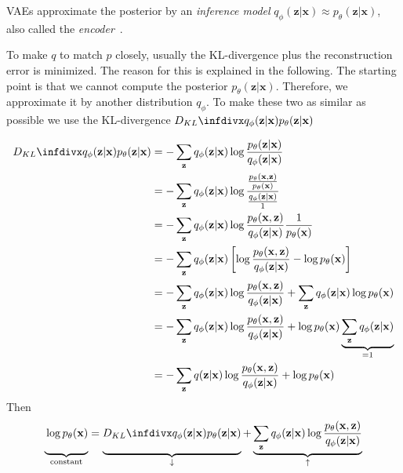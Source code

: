 \acp{VAE} approximate the posterior by an \textit{inference model} $q_\phi(\mathbf{z}|\mathbf{x}) \approx p_\theta(\mathbf{z}|\mathbf{x})$, also called the \textit{encoder}~\citep[p. 15]{kingma2019introduction}.

To make $q$ to match $p$ closely, usually the \ac{KL-divergence} plus the reconstruction error is minimized.
The reason for this is explained in the following.
The starting point is that we cannot compute the posterior $p_\theta(\mathbf{z}|\mathbf{x})$.
Therefore, we approximate it by another distribution $q_\phi$.
To make these two as similar as possible we use the \ac{KL-divergence} $\kldiv{q_\phi(\mathbf{z}|\mathbf{x})}{p_\theta(\mathbf{z}|\mathbf{x})}$

\begin{align}
    \kldiv{q_\phi(\mathbf{z}|\mathbf{x})}{p_\theta(\mathbf{z}|\mathbf{x})} &= -\sum_\mathbf{z} q_\phi(\mathbf{z}|\mathbf{x}) \log \frac{p_\theta(\mathbf{z}|\mathbf{x})}{q_\phi(\mathbf{z}|\mathbf{x})} \\
    &= -\sum_\mathbf{z} q_\phi(\mathbf{z}|\mathbf{x}) \log \frac{\frac{p_\theta(\mathbf{x},\mathbf{z})}{p_\theta(\mathbf{x})}}{\frac{q_\phi(\mathbf{z}|\mathbf{x})}{1}}\\
    &= -\sum_\mathbf{z} q_\phi(\mathbf{z}|\mathbf{x}) \log \frac{p_\theta(\mathbf{x},\mathbf{z})}{q_\phi(\mathbf{z}|\mathbf{x})}\frac{1}{p_\theta(\mathbf{x})}\\
    &= -\sum_\mathbf{z} q_\phi(\mathbf{z}|\mathbf{x}) \left[ \log \frac{p_\theta(\mathbf{x},\mathbf{z})}{q_\phi(\mathbf{z}|\mathbf{x})} - \log p_\theta(\mathbf{x}) \right]\\
    &= -\sum_\mathbf{z} q_\phi(\mathbf{z}|\mathbf{x}) \log \frac{p_\theta(\mathbf{x},\mathbf{z})}{q_\phi(\mathbf{z}|\mathbf{x})} + \sum_\mathbf{z} q_\phi(\mathbf{z}|\mathbf{x}) \log p_\theta(\mathbf{x}) \\
    &= -\sum_\mathbf{z} q_\phi(\mathbf{z}|\mathbf{x}) \log \frac{p_\theta(\mathbf{x},\mathbf{z})}{q_\phi(\mathbf{z}|\mathbf{x})} + \log p_\theta(\mathbf{x}) \underbrace{\sum_\mathbf{z} q_\phi(\mathbf{z}|\mathbf{x})}_{=1} \\
    &= -\sum_\mathbf{z} q(\mathbf{z}|\mathbf{x}) \log \frac{p_\theta(\mathbf{x},\mathbf{z})}{q_\phi(\mathbf{z}|\mathbf{x})} + \log p_\theta(\mathbf{x})
\end{align}
Then
\begin{align}
    \underbrace{\vphantom{\sum_\mathbf{z} x}\log p_\theta(\mathbf{x})}_{\text{constant}} =  \underbrace{\vphantom{\sum_\mathbf{z} x}\kldiv{q_\phi(\mathbf{z}|\mathbf{x})}{p_\theta(\mathbf{z}|\mathbf{x})}}_{\downarrow}  + \underbrace{\sum_\mathbf{z} q_\phi(\mathbf{z}|\mathbf{x}) \log \frac{p_\theta(\mathbf{x},\mathbf{z})}{q_\phi(\mathbf{z}|\mathbf{x})}}_{\uparrow}
\end{align}
